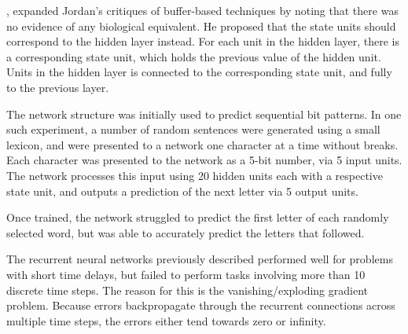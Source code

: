 


\cite{Elman:1990:Finding}, expanded Jordan's critiques of buffer-based
techniques by noting that there was no evidence of any biological equivalent.
He proposed that the state units should correspond to the hidden layer instead.
For each unit in the hidden layer, there is a corresponding state unit, which
holds the previous value of the hidden unit.
Units in the hidden layer is connected to the corresponding state unit, and
fully to the previous layer.
\begin{center}
    
\end{center}
The network structure was initially used to predict sequential bit patterns.
In one such experiment, a number of random sentences were generated using a
small lexicon, and were presented to a network one character at a time without
breaks.
Each character was presented to the network as a 5-bit number, via 5 input
units.
The network processes this input using 20 hidden units each with a respective
state unit, and outputs a prediction of the next letter via 5 output units.

Once trained, the network struggled to predict the first letter of each randomly
selected word, but was able to accurately predict the letters that followed.



%    



The recurrent neural networks previously described performed well for problems
with short time delays, but failed to perform tasks involving more than 10
discrete time steps.
The reason for this is the vanishing/exploding gradient problem.
Because errors backpropagate through the recurrent connections across multiple
time steps, the errors either tend towards zero or infinity.

